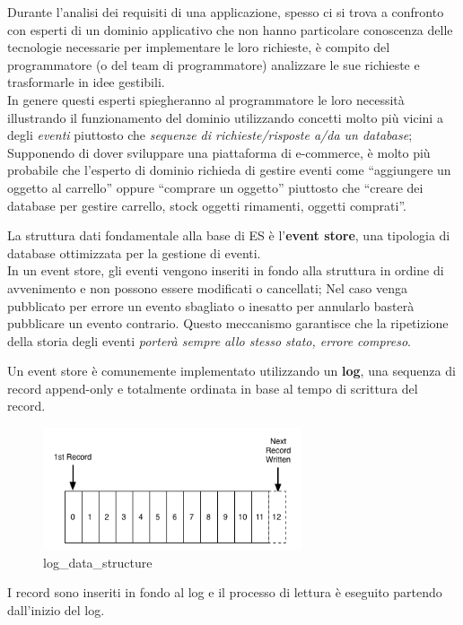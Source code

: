 \documentclass[]{article}
\begin{document}
Durante l'analisi dei requisiti di una applicazione, spesso ci si trova
a confronto con esperti di un dominio applicativo che non hanno
particolare conoscenza delle tecnologie necessarie per implementare le
loro richieste, è compito del programmatore (o del team di
programmatore) analizzare le sue richieste e trasformarle in idee
gestibili.\\
In genere questi esperti spiegheranno al programmatore le loro necessità
illustrando il funzionamento del dominio utilizzando concetti molto più
vicini a degli \emph{eventi} piuttosto che \emph{sequenze di
richieste/risposte a/da un database}; Supponendo di dover sviluppare una
piattaforma di e-commerce, è molto più probabile che l'esperto di
dominio richieda di gestire eventi come ``aggiungere un oggetto al
carrello'' oppure ``comprare un oggetto'' piuttosto che ``creare dei
database per gestire carrello, stock oggetti rimamenti, oggetti
comprati''.

La struttura dati fondamentale alla base di ES è l'\textbf{event store},
una tipologia di database ottimizzata per la gestione di eventi.\\
In un event store, gli eventi vengono inseriti in fondo alla struttura
in ordine di avvenimento e non possono essere modificati o cancellati;
Nel caso venga pubblicato per errore un evento sbagliato o inesatto per
annularlo basterà pubblicare un evento contrario. Questo meccanismo
garantisce che la ripetizione della storia degli eventi \emph{porterà
sempre allo stesso stato, errore compreso}.

Un event store è comunemente implementato utilizzando un \textbf{log},
una sequenza di record append-only e totalmente ordinata in base al
tempo di scrittura del record.

\begin{figure}
\centering
\includegraphics[width=0.68000\textwidth]{../images/log.png}
\caption{log\_data\_structure \label{figure_1}}
\end{figure}

I record sono inseriti in fondo al log e il processo di lettura è
eseguito partendo dall'inizio del log.
\end{document}
